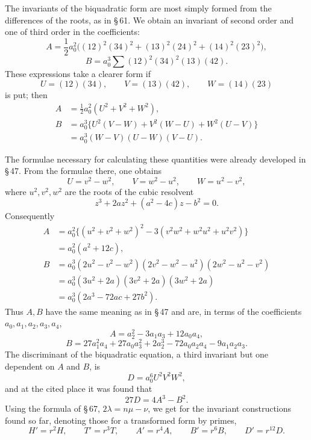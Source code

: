 \documentclass[11pt]{article}
\begin{document}
The invariants of the biquadratic form are most simply formed from the differences of the roots, as in \S\,61. We obtain an invariant of second order and one of third order in the coefficients:
\begin{equation}
 A=\frac12a_0^2\bigl((12)^2(34)^2+(13)^2(24)^2+(14)^2(23)^2\bigr),
\tag{4}
\end{equation}
\begin{equation}
 B=a_0^3\sum(12)^2(34)^2(13)(42).
\tag{5}
\end{equation}
These expressions take a clearer form if
\begin{equation}
 U=(12)(34),
 \qquad V=(13)(42),
 \qquad W=(14)(23)
\tag{6}
\end{equation}
is put; then
\begin{equation}
\begin{aligned}
 A&=\frac12a_0^2(U^2+V^2+W^2),\\
 B&=a_0^3\{U^2(V-W)+V^2(W-U)+W^2(U-V)\}\\
  &=a_0^3(W-V)(U-W)(V-U).
\end{aligned}
\tag{7}
\end{equation}

The formulae necessary for calculating these quantities were already developed in \S\,47. From the formulae there, one obtains
\[
 U=v^2-w^2,
 \qquad V=w^2-u^2,
 \qquad W=u^2-v^2,
\]
where $u^2,v^2,w^2$ are the roots of the cubic resolvent
\[
 z^3+2az^2+(a^2-4c)z-b^2=0.
\]
Consequently
\[
\begin{aligned}
 A&=a_0^2\{(u^2+v^2+w^2)^2-3(v^2w^2+w^2u^2+u^2v^2)\}\\
  &=a_0^2(a^2+12c),\\
 B&=a_0^3(2u^2-v^2-w^2)(2v^2-w^2-u^2)(2w^2-u^2-v^2)\\
  &=a_0^3(3u^2+2a)(3v^2+2a)(3w^2+2a)\\
  &=a_0^3(2a^3-72ac+27b^2).
\end{aligned}
\]
Thus $A,B$ have the same meaning as in \S\,47 and are, in terms of the coefficients $a_0,a_1,a_2,a_3,a_4$,
\begin{equation}
 A=a_2^2-3a_1a_3+12a_0a_4,
\tag{8}
\end{equation}
\begin{equation}
 B=27a_1^2a_4+27a_0a_3^2+2a_2^3-72a_0a_2a_4-9a_1a_2a_3.
\tag{9}
\end{equation}
The discriminant of the biquadratic equation, a third invariant but one dependent on $A$ and $B$, is
\begin{equation}
 D=a_0^6U^2V^2W^2,
\tag{10}
\end{equation}
and at the cited place it was found that
\begin{equation}
 27D=4A^3-B^2.
\tag{11}
\end{equation}
Using the formula of \S\,67, $2\lambda=n\mu-\nu$, we get for the invariant constructions found so far, denoting those for a transformed form by primes,
\begin{equation}
 H'=r^2H,
 \qquad
 T'=r^3T,
 \qquad
 A'=r^4A,
 \qquad
 B'=r^6B,
 \qquad
 D'=r^{12}D.
\tag{12}
\end{equation}
\end{document}
